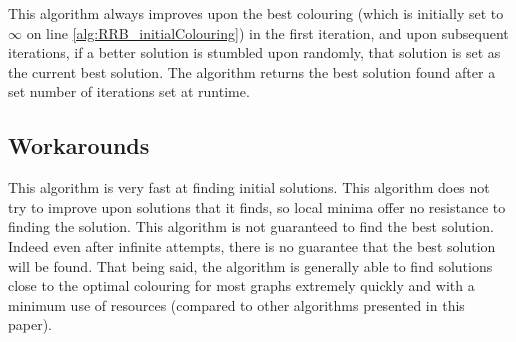 This algorithm always improves upon the best colouring (which is initially set to $\infty$ on line \ref{alg:RRB_initialColouring}) in the first iteration, and upon subsequent iterations, if a better solution is stumbled upon randomly, that solution is set as the current best solution. The algorithm returns the best solution found after a set number of iterations set at runtime. 

\subsection{Workarounds}
This algorithm is very fast at finding initial solutions. This algorithm does not try to improve upon solutions that it finds, so local minima offer no resistance to finding the solution. This algorithm is not guaranteed to find the best solution. Indeed even after infinite attempts, there is no guarantee that the best solution will be found. That being said, the algorithm is generally able to find solutions close to the optimal colouring for most graphs extremely quickly and with a minimum use of resources (compared to other algorithms presented in this paper).
